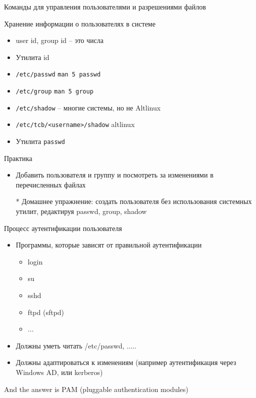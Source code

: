 \documentclass[ignorenonframetext, professionalfonts, hyperref={pdftex, unicode}]{beamer}
\begin{document}
\begin{frame}{Команды для управления пользователями и разрешениями файлов}
\begin{frame}{Хранение информации о пользователях в системе}
  \begin{itemize}
    \item user id, group id -- это числа
    \item Утилита id 
    \item {\tt /etc/passwd} {\tt man 5 passwd}
    \item {\tt /etc/group}  {\tt man 5 group}
    \item {\tt /etc/shadow} -- многие системы, но не Altlinux
    \item {\tt /etc/tcb/<username>/shadow} altlinux
    \item Утилита {\tt passwd}
  \end{itemize}
  \pause
  \begin{block}{Практика}
    \begin{itemize}
       \item Добавить пользователя и группу и посмотреть за изменениями в перечисленных файлах
       \item[*] Домашнее упражнение: создать пользователя без использования системных утилит, редактируя passwd, group, shadow
    \end{itemize}
  \end{block}
\end{frame}


\begin{frame}{Процесс аутентификации пользователя}
  \begin{itemize}
    \item Программы, которые зависят от правильной аутентификации
      \begin{itemize}
        \item login
        \item su
        \item sshd
        \item ftpd (sftpd)
        \item ...
      \end{itemize}
    \item Должны уметь читать /etc/passwd, .....
    \item Должны адаптироваться к изменениям (например аутентификация через Windows AD, или kerberos)
   \end{itemize}
   \pause
   \begin{center}
      And the answer is \pause PAM (pluggable authentication modules)  
   \end{center}
\end{frame}


\end{frame}
\end{document}
